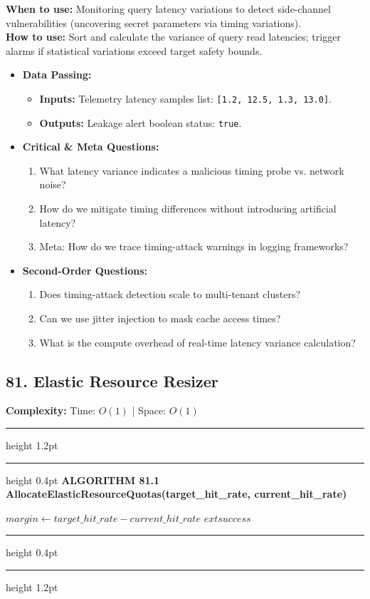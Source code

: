 \documentclass[11pt,a4paper]{article}
\newenvironment{textbookalgo}[2]{%
  \par\addvspace{1.2em}\noindent
  \hrule height 1.2pt
  \vspace{1.5pt}
  \hrule height 0.4pt
  \vspace{5pt}
  {\noindent\large\bfseries\sffamily ALGORITHM #1 \quad #2}
  \par\vspace{5pt}
  \RestyleAlgo{plain}
}{%
  \par\vspace{4pt}
  \hrule height 0.4pt
  \vspace{1.5pt}
  \hrule height 1.2pt
  \par\addvspace{1.2em}
}
\theoremstyle{definition}
\begin{document}
\noindent
\textbf{When to use:} Monitoring query latency variations to detect side-channel vulnerabilities (uncovering secret parameters via timing variations).\\
\textbf{How to use:} Sort and calculate the variance of query read latencies; trigger alarms if statistical variations exceed target safety bounds.
\begin{itemize}[leftmargin=*]
  \item[] \textbf{Data Passing:}
    \begin{itemize}
      \item \textbf{Inputs:} Telemetry latency samples list: \texttt{[1.2, 12.5, 1.3, 13.0]}.
      \item \textbf{Outputs:} Leakage alert boolean status: \texttt{true}.
    \end{itemize}
  \item[] \textbf{Critical \& Meta Questions:}
  \begin{enumerate}
    \item What latency variance indicates a malicious timing probe vs. network noise?
    \item How do we mitigate timing differences without introducing artificial latency?
    \item Meta: How do we trace timing-attack warnings in logging frameworks?
  \end{enumerate}
  \item[] \textbf{Second-Order Questions:}
  \begin{enumerate}
    \item Does timing-attack detection scale to multi-tenant clusters?
    \item Can we use jitter injection to mask cache access times?
    \item What is the compute overhead of real-time latency variance calculation?
  \end{enumerate}
\end{itemize}
\medskip

\clearpage
\subsection{81. Elastic Resource Resizer}


\noindent
\textbf{Complexity:} Time: $O(1)$ | Space: $O(1)$
\smallskip

\begin{textbookalgo}{81.1}{AllocateElasticResourceQuotas(target\_hit\_rate, current\_hit\_rate)}
\begin{algorithm}[H]
$margin \leftarrow target\_hit\_rate - current\_hit\_rate$\;
\Return $	ext{success}$\;
\end{algorithm}
\end{textbookalgo}
\end{document}
